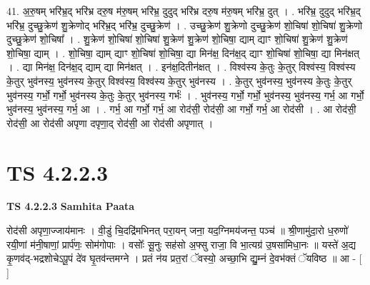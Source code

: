 \documentclass[17pt]{extarticle}
\begin{document}
41. अ॒रु॒षम् भरि॑भ्र॒द् भरि॑भ्र दरु॒ष म॑रु॒षम् भरि॑भ्र॒ दुदुद् भरि॑भ्र दरु॒ष म॑रु॒षम् भरि॑भ्र॒ दुत् । . भरि॑भ्र॒ दुदुद् भरि॑भ्र॒द् भरि॑भ्र॒ दुच्छु॒क्रेण॑ शु॒क्रेणोद् भरि॑भ्र॒द् भरि॑भ्र॒ दुच्छु॒क्रेण॑ । . उच्छु॒क्रेण॑ शु॒क्रेणो दुच्छु॒क्रेण॑ शो॒चिषा॑ शो॒चिषा॑ शु॒क्रेणो दुच्छु॒क्रेण॑ शो॒चिषा᳚ । . शु॒क्रेण॑ शो॒चिषा॑ शो॒चिषा॑ शु॒क्रेण॑ शु॒क्रेण॑ शो॒चिषा॒ द्याम् द्याꣳ शो॒चिषा॑ शु॒क्रेण॑ शु॒क्रेण॑ शो॒चिषा॒ द्याम् । . शो॒चिषा॒ द्याम् द्याꣳ शो॒चिषा॑ शो॒चिषा॒ द्या मिन॑क्ष॒ दिन॑क्ष॒द् द्याꣳ शो॒चिषा॑ शो॒चिषा॒ द्या मिन॑क्षत् । . द्या मिन॑क्ष॒ दिन॑क्ष॒द् द्याम् द्या मिन॑क्षत् । . इन॑क्ष॒दितीन॑क्षत् । . विश्व॑स्य के॒तुः के॒तुर् विश्व॑स्य॒ विश्व॑स्य के॒तुर् भुव॑नस्य॒ भुव॑नस्य के॒तुर् विश्व॑स्य॒ विश्व॑स्य के॒तुर् भुव॑नस्य । . के॒तुर् भुव॑नस्य॒ भुव॑नस्य के॒तुः के॒तुर् भुव॑नस्य॒ गर्भो॒ गर्भो॒ भुव॑नस्य के॒तुः के॒तुर् भुव॑नस्य॒ गर्भः॑ । . भुव॑नस्य॒ गर्भो॒ गर्भो॒ भुव॑नस्य॒ भुव॑नस्य॒ गर्भ॒ आ गर्भो॒ भुव॑नस्य॒ भुव॑नस्य॒ गर्भ॒ आ । . गर्भ॒ आ गर्भो॒ गर्भ॒ आ रोद॑सी॒ रोद॑सी॒ आ गर्भो॒ गर्भ॒ आ रोद॑सी । . आ रोद॑सी॒ रोद॑सी॒ आ रोद॑सी अपृणा दपृणा॒द् रोद॑सी॒ आ रोद॑सी अपृणात् । \newline
\pagebreak
{}

\section{ TS 4.2.2.3 }

\textbf{TS 4.2.2.3 } \newline
\textbf{Samhita Paata} \newline

रोद॑सी अपृणा॒ज्जाय॑मानः । वी॒डुं चि॒दद्रि॑मभिनत् परा॒यन् जना॒ यद॒ग्निमय॑जन्त॒ पञ्च॑ ॥ श्री॒णामु॑दा॒रो ध॒रुणो॑ रयी॒णां म॑नी॒षाणां॒ प्रार्प॑णः॒ सोम॑गोपाः । वसोः᳚ सू॒नुः सह॑सो अ॒फ्सु राजा॒ वि भा॒त्यग्र॑ उ॒षसा॑मिधा॒नः ॥ यस्ते॑ अ॒द्य कृ॒णव॑द्-भद्रशोचेऽपू॒पं दे॑व घृ॒तव॑न्तमग्ने । प्रतं न॑य प्रत॒रां ॅवस्यो॒ अच्छा॒भि द्यु॒म्नं दे॒वभ॑क्तं ॅयविष्ठ ॥ आ - [  ] \newline
\end{document}
